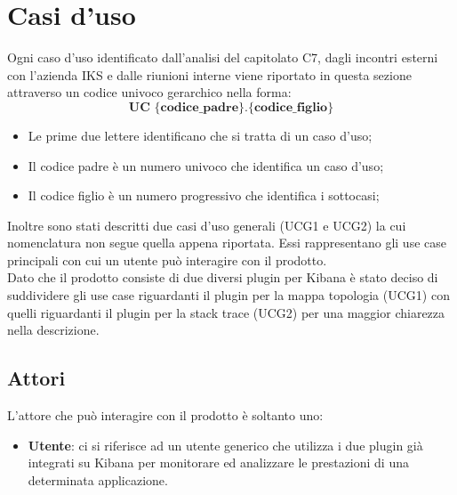 \section{Casi d'uso}
Ogni caso d'uso identificato dall'analisi del capitolato C7, dagli incontri esterni con l'azienda IKS e dalle riunioni interne viene riportato in questa sezione attraverso un codice univoco gerarchico nella forma:
 $$ \textbf{UC \{codice\_padre\}.\{codice\_figlio\}  } $$
\begin{itemize}
	\item Le prime due lettere identificano che si tratta di un caso d'uso;
	\item Il codice padre è un numero univoco che identifica un caso d'uso;
	\item Il codice figlio è un numero progressivo che identifica i sottocasi;\\
\end{itemize}

Inoltre sono stati descritti due casi d'uso generali (UCG1 e UCG2) la cui nomenclatura non segue quella appena riportata. Essi rappresentano gli use case principali con cui un utente può interagire con il prodotto. \\ Dato che il prodotto consiste di due diversi plugin per Kibana è stato deciso di suddividere gli use case riguardanti il plugin per la mappa topologia (UCG1) con quelli riguardanti il plugin per la stack trace (UCG2) per una maggior chiarezza nella descrizione.
\subsection{Attori} \label{attori}
L'attore che può interagire con il prodotto è soltanto uno:
\begin{itemize}
	\item \textbf{Utente}: ci si riferisce ad un utente generico che utilizza i due plugin già integrati su Kibana per monitorare ed analizzare le prestazioni di una determinata applicazione. 
\end{itemize}

 \hypertarget{UCG1}{}
